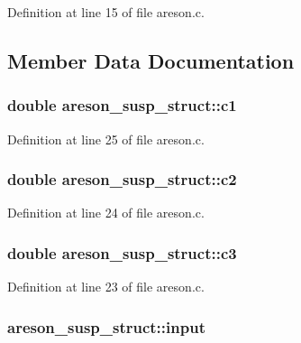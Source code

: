 Definition at line 15 of file areson.\+c.



\subsection{Member Data Documentation}
\subsubsection[{\texorpdfstring{c1}{c1}}]{\setlength{\rightskip}{0pt plus 5cm}double areson\+\_\+susp\+\_\+struct\+::c1}\hypertarget{structareson__susp__struct_aaec1fde740833af135a8b9e6029a0398}{}\label{structareson__susp__struct_aaec1fde740833af135a8b9e6029a0398}


Definition at line 25 of file areson.\+c.

\subsubsection[{\texorpdfstring{c2}{c2}}]{\setlength{\rightskip}{0pt plus 5cm}double areson\+\_\+susp\+\_\+struct\+::c2}\hypertarget{structareson__susp__struct_a1646d658169d713a22fc4f4717cdb483}{}\label{structareson__susp__struct_a1646d658169d713a22fc4f4717cdb483}


Definition at line 24 of file areson.\+c.

\subsubsection[{\texorpdfstring{c3}{c3}}]{\setlength{\rightskip}{0pt plus 5cm}double areson\+\_\+susp\+\_\+struct\+::c3}\hypertarget{structareson__susp__struct_a8eac7c481e7bcc65c009fe6ddee49bc3}{}\label{structareson__susp__struct_a8eac7c481e7bcc65c009fe6ddee49bc3}


Definition at line 23 of file areson.\+c.

\subsubsection[{\texorpdfstring{input}{input}}]{ areson\+\_\+susp\+\_\+struct\+::input}\hypertarget{structareson__susp__struct_a73c3679f653c17ea3e3778b7b95aaef5}{}\label{structareson__susp__struct_a73c3679f653c17ea3e3778b7b95aaef5}


